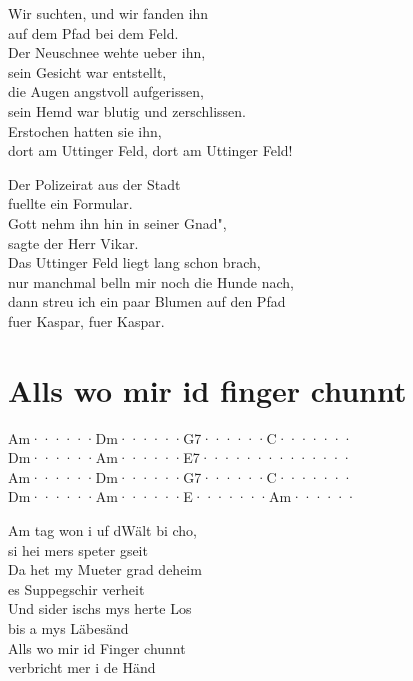 \documentclass[
  letterpaper,
  a5paper]{memoir}
\begin{document}
Wir suchten, und wir fanden ihn\\
auf dem Pfad bei dem Feld.\\
Der Neuschnee wehte ueber ihn,\\
sein Gesicht war entstellt,\\
die Augen angstvoll aufgerissen,\\
sein Hemd war blutig und zerschlissen.\\
Erstochen hatten sie ihn,\\
dort am Uttinger Feld, dort am Uttinger Feld!

Der Polizeirat aus der Stadt\\
fuellte ein Formular.\\
Gott nehm\textquotesingle{} ihn hin in seiner Gnad"\textquotesingle,\\
sagte der Herr Vikar.\\
Das Uttinger Feld liegt lang schon brach,\\
nur manchmal bell\textquotesingle n mir noch die Hunde nach,\\
dann streu\textquotesingle{} ich ein paar Blumen auf den Pfad\\
fuer Kaspar, fuer Kaspar.

\hypertarget{alls-wo-mir-id-finger-chunnt}{%
\chapter{Alls wo mir id finger
chunnt}\label{alls-wo-mir-id-finger-chunnt}}

\textbar Am······\textbar Dm······\textbar G7······\textbar C·······\textbar{}\\
\textbar Dm······\textbar Am······\textbar E7······\textbar········\textbar{}\\
\textbar Am······\textbar Dm······\textbar G7······\textbar C·······\textbar{}\\
\textbar Dm······\textbar Am······\textbar E·······\textbar Am······\textbar{}

Am tag won i uf d\textquotesingle Wält bi cho,\\
si hei mers speter gseit\\
Da het my Mueter grad deheim\\
es Suppegschir verheit\\
Und sider ischs mys herte Los\\
bis a mys Läbesänd\\
Alls wo mir id Finger chunnt\\
verbricht mer i de Händ
\end{document}
